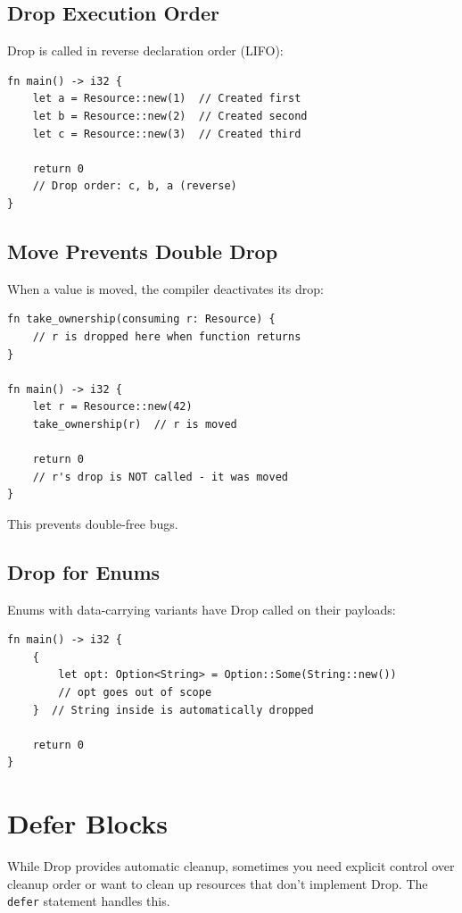 \subsection{Drop Execution Order}

Drop is called in reverse declaration order (LIFO):

\begin{lstlisting}
fn main() -> i32 {
    let a = Resource::new(1)  // Created first
    let b = Resource::new(2)  // Created second
    let c = Resource::new(3)  // Created third

    return 0
    // Drop order: c, b, a (reverse)
}
\end{lstlisting}

\subsection{Move Prevents Double Drop}

When a value is moved, the compiler deactivates its drop:

\begin{lstlisting}
fn take_ownership(consuming r: Resource) {
    // r is dropped here when function returns
}

fn main() -> i32 {
    let r = Resource::new(42)
    take_ownership(r)  // r is moved

    return 0
    // r's drop is NOT called - it was moved
}
\end{lstlisting}

This prevents double-free bugs.

\subsection{Drop for Enums}

Enums with data-carrying variants have Drop called on their payloads:

\begin{lstlisting}
fn main() -> i32 {
    {
        let opt: Option<String> = Option::Some(String::new())
        // opt goes out of scope
    }  // String inside is automatically dropped

    return 0
}
\end{lstlisting}

\section{Defer Blocks}

While Drop provides automatic cleanup, sometimes you need explicit control over cleanup order or want to clean up resources that don't implement Drop. The \texttt{defer} statement handles this.

